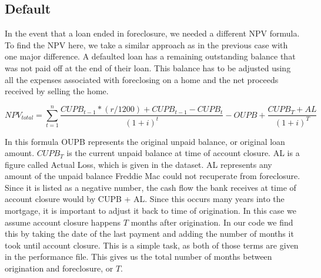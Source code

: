 \documentclass[12 pt]{uncw_thesis}
\theoremstyle{plain}
\theoremstyle{remark}
\theoremstyle{definition}
\begin{document}
\subsection{Default}
In the event that a loan ended in foreclosure, we needed a different NPV formula. To find the NPV here, we take a similar approach as in the previous case with one major difference. A defaulted loan has a remaining outstanding balance that was not paid off at the end of their loan. This balance has to be adjusted using all the expenses associated with foreclosing on a home and the net proceeds received by selling the home. 
\begin{centering}
\[NPV_{total} = \sum_{t=1}^n \frac{CUPB_{t-1}*(r/1200) + CUPB_{t-1} - CUPB_{t}}{(1+i)^t} - OUPB + \frac{CUPB_T + AL}{(1+i)^T}\]
\end{centering}
In this formula OUPB represents the original unpaid balance, or original loan amount. $CUPB_T$ is the current unpaid balance at time of account closure. AL is a figure called Actual Loss,  which is given in the dataset. AL represents any amount of the unpaid balance Freddie Mac could not recuperate from foreclosure. Since it is listed as a negative number, the cash flow the bank receives at time of account closure would by CUPB + AL. Since this occurs many years into the mortgage, it is important to adjust it back to time of origination. In this case we assume account closure happens \(T\) months after origination. In our code we find this by taking the date of the last payment and adding the number of months it took until account closure. This is a simple task, as both of those terms are given in the performance file. This gives us the total number of months between origination and foreclosure, or \(T\). 
\end{document}
